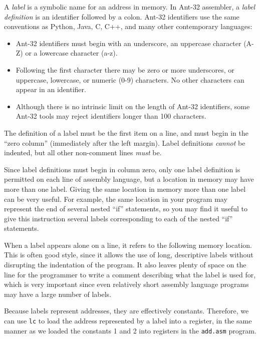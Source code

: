A {\em label} is a symbolic name for an address in memory.  In
Ant-32 assembler, a {\em label definition} is an identifier followed
by a colon.  Ant-32 identifiers use the same conventions as
Python, Java, C, C++, and many other contemporary languages:

\begin{itemize}

\item Ant-32 identifiers must begin with an underscore, an
	uppercase character (A-Z) or a lowercase character (a-z).

\item Following the first character there may be zero or more
	underscores, or uppercase, lowercase, or numeric (0-9)
	characters.  No other characters can appear in an identifier.

\item Although there is no intrinsic limit on the length of
	Ant-32 identifiers, some Ant-32 tools may reject
	identifiers longer than 100 characters.

\end{itemize}

The definition of a label must be the first item on a line, and must
begin in the ``zero column'' (immediately after the left margin). 
Label definitions {\em cannot} be indented, but all other non-comment
lines {\em must} be.

Since label definitions must begin in column zero, only one label
definition is permitted on each line of assembly language, but a
location in memory may have more than one label.  Giving the same
location in memory more than one label can be very useful.  For
example, the same location in your program may represent the end of
several nested ``if'' statements, so you may find it useful to give
this instruction several labels corresponding to each of the nested
``if'' statements.

When a label appears alone on a line, it refers to the following
memory location.  This is often good style, since it allows the use of
long, descriptive labels without disrupting the indentation of the
program.  It also leaves plenty of space on the line for the
programmer to write a comment describing what the label is used for,
which is very important since even relatively short assembly language
programs may have a large number of labels.

Because labels represent addresses, they are effectively constants. 
Therefore, we can use {\tt lc} to load the address represented by a
label into a register, in the same manner as we loaded the constants
1 and 2 into registers in the {\tt add.asm} program.

